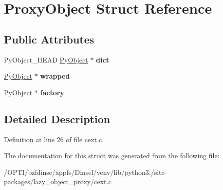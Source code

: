 \hypertarget{structProxyObject}{}\section{Proxy\+Object Struct Reference}
\label{structProxyObject}
\subsection*{Public Attributes}
\begin{DoxyCompactItemize}
\item 
Py\+Object\+\_\+\+H\+E\+AD \hyperlink{struct__object}{Py\+Object} $\ast$ {\bfseries dict}\hypertarget{structProxyObject_aad706e20563e6b0d29f97a6c795f4919}{}\label{structProxyObject_aad706e20563e6b0d29f97a6c795f4919}

\item 
\hyperlink{struct__object}{Py\+Object} $\ast$ {\bfseries wrapped}\hypertarget{structProxyObject_ab0538d899569020f509579ca5ad05c6a}{}\label{structProxyObject_ab0538d899569020f509579ca5ad05c6a}

\item 
\hyperlink{struct__object}{Py\+Object} $\ast$ {\bfseries factory}\hypertarget{structProxyObject_ab5f43cf8aaa9d8dc99863abee9fede4e}{}\label{structProxyObject_ab5f43cf8aaa9d8dc99863abee9fede4e}

\end{DoxyCompactItemize}


\subsection{Detailed Description}


Definition at line 26 of file cext.\+c.



The documentation for this struct was generated from the following file\+:\begin{DoxyCompactItemize}
\item 
/\+O\+P\+T\+I/bzfdinse/appfs/\+Dinsel/venv/lib/python3./site-\/packages/lazy\+\_\+object\+\_\+proxy/cext.\+c\end{DoxyCompactItemize}
